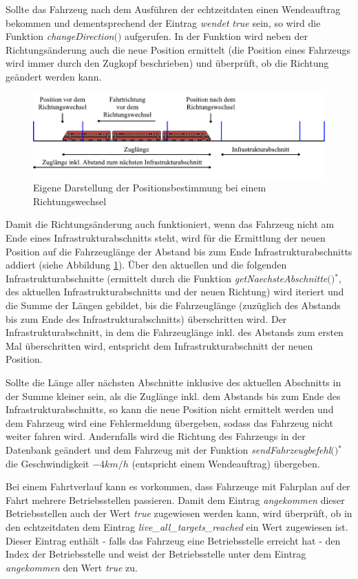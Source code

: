 Sollte das Fahrzeug nach dem Ausführen der \Gls{echtzeitdaten} einen Wendeauftrag bekommen und dementsprechend der Eintrag \textit{wendet} \textit{true} sein, so wird die Funktion \textit{change\-Direction$($$)$} aufgerufen. In der Funktion wird neben der Richtungsänderung auch die neue Position ermittelt (die Position eines Fahrzeugs wird immer durch den Zugkopf beschrieben) und überprüft, ob die Richtung geändert werden kann. 
\begin{figure}
  \includegraphics[width=\linewidth]{../images/vector/richtungsaenderung.pdf}
  \caption{Eigene Darstellung der Positionsbestimmung bei einem Richtungswechsel}
  \label{fig:richtungsaenderung}
\end{figure}
Damit die Richtungsänderung auch funktioniert, wenn das Fahrzeug nicht am Ende eines Infrastrukturabschnitts steht, wird für die Ermittlung der neuen Position auf die Fahrzeuglänge der Abstand bis zum Ende Infrastrukturabschnitts addiert (siehe Abbildung \ref{fig:richtungsaenderung}). Über den aktuellen und die folgenden Infrastrukturabschnitte (ermittelt durch die Funktion \textit{getNaechsteAbschnitte$($$)$}$^\ast$, des aktuellen Infrastrukturabschnitts und der neuen Richtung) wird iteriert und die Summe der Längen gebildet, bis die Fahrzeuglänge (zuzüglich des Abstands bis zum Ende des Infrastrukturabschnitts) überschritten wird. Der Infrastrukturabschnitt, in dem die Fahrzeuglänge inkl. des Abstands zum ersten Mal überschritten wird, entspricht dem Infrastrukturabschnitt der neuen Position.

Sollte die Länge aller nächsten Abschnitte inklusive des aktuellen Abschnitts in der Summe kleiner sein, als die Zuglänge inkl. dem Abstands bis zum Ende des Infrastrukturabschnitts, so kann die neue Position nicht ermittelt werden und dem Fahrzeug wird eine Fehlermeldung übergeben, sodass das Fahrzeug nicht weiter fahren wird. Andernfalls wird die Richtung des Fahrzeugs in der Datenbank geändert und dem Fahrzeug mit der Funktion \textit{sendFahrzeugbefehl$($$)$}$^\ast$ die Geschwindigkeit $-4km/h$ (entspricht einem Wendeauftrag) übergeben.

Bei einem Fahrtverlauf kann es vorkommen, dass Fahrzeuge mit Fahrplan auf der Fahrt mehrere Betriebsstellen passieren. Damit dem Eintrag \textit{angekommen} dieser Betriebsstellen auch der Wert \textit{true} zugewiesen werden kann, wird überprüft, ob in den \Gls{echtzeitdaten} dem Eintrag \textit{live\_all\_targets\_reached} ein Wert zugewiesen ist. Dieser Eintrag enthält - falls das Fahrzeug eine Betriebsstelle erreicht hat - den Index der Betriebsstelle und weist der Betriebsstelle unter dem Eintrag \textit{angekommen} den Wert \textit{true} zu.

